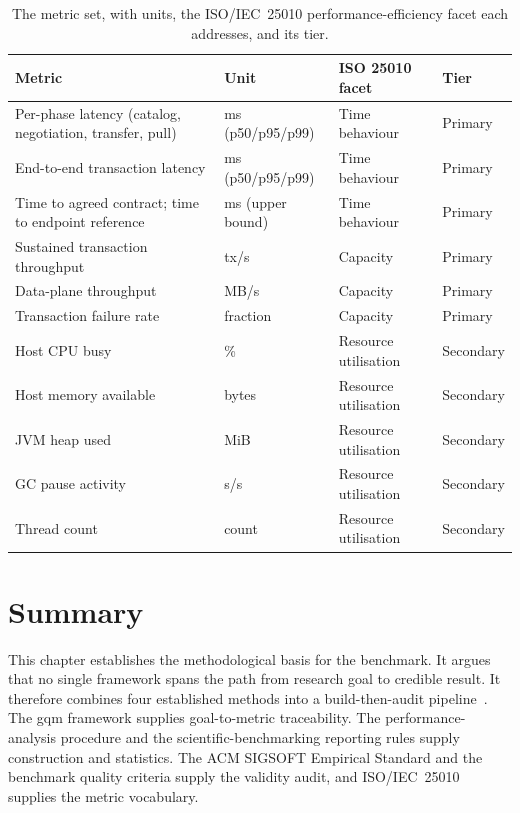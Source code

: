 \begin{table}[htbp]
    \centering
    \small
    \setlength{\tabcolsep}{6pt}
    \begin{tabularx}{\textwidth}{@{}X l l l@{}}
        \toprule
        \textbf{Metric} & \textbf{Unit} & \textbf{ISO 25010 facet} & \textbf{Tier} \\
        \midrule
        Per-phase latency (catalog, negotiation, transfer, pull) & ms (p50/p95/p99) & Time behaviour & Primary \\
        End-to-end transaction latency & ms (p50/p95/p99) & Time behaviour & Primary \\
        Time to agreed contract; time to endpoint reference & ms (upper bound) & Time behaviour & Primary \\
        Sustained transaction throughput & tx/s & Capacity & Primary \\
        Data-plane throughput & MB/s & Capacity & Primary \\
        Transaction failure rate & fraction & Capacity & Primary \\
        \midrule
        Host CPU busy & \% & Resource utilisation & Secondary \\
        Host memory available & bytes & Resource utilisation & Secondary \\
        JVM heap used & MiB & Resource utilisation & Secondary \\
        GC pause activity & s/s & Resource utilisation & Secondary \\
        Thread count & count & Resource utilisation & Secondary \\
        \bottomrule
    \end{tabularx}
    \caption[Primary and secondary performance metrics]{The metric set, with units, the ISO/IEC~25010 performance-efficiency facet each addresses, and its tier.}
    \label{tab:metrics-summary}
\end{table}

\newpage

\section{Summary}\label{sec:research-summary}

This chapter establishes the methodological basis for the benchmark. It argues that no single framework spans the path from research goal to credible result. It therefore combines four established methods into a build-then-audit pipeline~\citep{caldiera1994goal, jain1991art, hoefler2015scientific, Ralph2020, iso25010}. The \gls{gqm} framework supplies goal-to-metric traceability. The performance-analysis procedure and the scientific-benchmarking reporting rules supply construction and statistics. The ACM SIGSOFT Empirical Standard and the benchmark quality criteria supply the validity audit, and ISO/IEC~25010 supplies the metric vocabulary.

